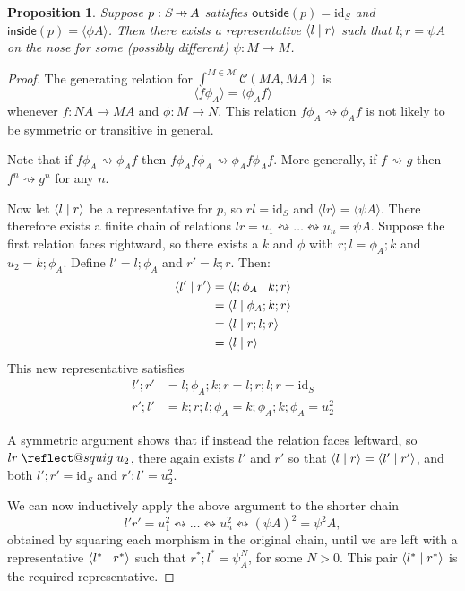 \documentclass[11pt,letterpaper]{article}
\makeatletter
\theoremstyle{plain}
\newtheorem{proposition}[theorem]{Proposition}
\theoremstyle{definition}
\newcommand{\C}{\mathscr{C}}
\newcommand{\M}{\mathscr{M}}
\newcommand{\id}{\mathrm{id}}
\newcommand{\rep}[2]{{\ensuremath \left\langle #1 \mid #2 \right\rangle}}
\newcommand{\inside}{\mathsf{inside}}
\newcommand{\outside}{\mathsf{outside}}
\newcommand{\hto}{\ensuremath{\,\mathaccent\shortmid\rightarrow\,}}
\providecommand{\leftsquigarrow}{%
  \mathrel{\mathpalette\reflect@squig\relax}%
}
\newcommand{\reflect@squig}[2]{%
  \reflectbox{$\m@th#1\rightsquigarrow$}%
}
\makeatother
\begin{document}
\begin{proposition}\label{prop:onthenose}
  Suppose $p : S \hto A$ satisfies $\outside(p) = \id_S$ and $\inside(p) = \langle \phi A \rangle$. Then there exists a representative $\rep{l}{r}$ such that $l ; r = \psi A$ on the nose for some (possibly different) $\psi : M \to M$.
\end{proposition}
\begin{proof}
  The generating relation for $\int^{M \in \M} \C(M A, M A)$ is
  \[ \langle f \phi_A \rangle = \langle \phi_A f \rangle \]
  whenever $f : N A \to M A$ and $\phi : M \to N$. This relation $f \phi_A \rightsquigarrow \phi_A f$ is not likely to be symmetric or transitive in general.

  Note that if $f \phi_A \rightsquigarrow \phi_A f$ then $f \phi_A f \phi_A \rightsquigarrow \phi_A f \phi_A f$. More generally, if $f \rightsquigarrow g$ then $f^n \rightsquigarrow g^n$ for any $n$.

  Now let $\rep{l}{r}$ be a representative for $p$, so $rl = \id_S$ and $\langle lr \rangle = \langle \psi A\rangle$. There therefore exists a finite chain of relations $lr = u_1 \leftrightsquigarrow \dots \leftrightsquigarrow u_n = \psi A$. Suppose the first relation faces rightward, so there exists a $k$ and $\phi$ with $r;l = \phi_A;k$ and $u_2 = k;\phi_A$. Define $l' = l;\phi_A$ and $r' = k;r$. Then:
\begin{align*}
\rep{l'}{r'}
&= \rep{l ; \phi_A}{k ; r} \\
&= \rep{l}{\phi_A ; k ; r} \\
&= \rep{l}{r ; l; r} \\
&= \rep{l}{r}
\end{align*}
This new representative satisfies
\begin{align*}
l';r' &= l;\phi_A;k;r = l;r;l;r = \id_S \\
r';l' &= k;r;l;\phi_A = k;\phi_A;k;\phi_A = u_2^2
\end{align*}

  A symmetric argument shows that if instead the relation faces leftward, so $lr \leftsquigarrow u_2$, there again exists $l'$ and $r'$ so that $\rep{l}{r} = \rep{l'}{r'}$, and both $l';r' = \id_S$ and $r';l' = u_2^2$.

  We can now inductively apply the above argument to the shorter chain \[l'r' = u_1^2 \leftrightsquigarrow \dots \leftrightsquigarrow u_n^2 \leftrightsquigarrow {(\psi A)}^2 = \psi^2 A,\] obtained by squaring each morphism in the original chain, until we are left with a representative $\rep{l^*}{r^*}$ such that $r^*;l^* = \psi^N_A$, for some $N>0$. This pair $\rep{l^*}{r^*}$ is the required representative.
\end{proof}
\end{document}
